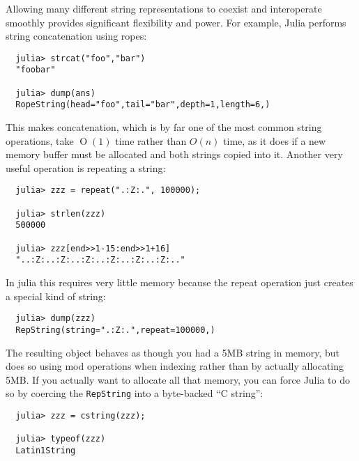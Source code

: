 \documentclass{article}
\renewcommand{\O}{\ensuremath{\operatorname{O}}}
\begin{document}
Allowing many different string representations to coexist and interoperate smoothly provides significant flexibility and power.
For example, Julia performs string concatenation using ropes:
\begin{verbatim}
  julia> strcat("foo","bar")
  "foobar"

  julia> dump(ans)
  RopeString(head="foo",tail="bar",depth=1,length=6,)
\end{verbatim}
This makes concatenation, which is by far one of the most common string operations, take $\O(1)$ time rather than $O(n)$ time, as it does if a new memory buffer must be allocated and both strings copied into it.
Another very useful operation is repeating a string:
\begin{verbatim}
  julia> zzz = repeat(".:Z:.", 100000);

  julia> strlen(zzz)
  500000

  julia> zzz[end>>1-15:end>>1+16]
  "..:Z:..:Z:..:Z:..:Z:..:Z:..:Z:.."
\end{verbatim}
In julia this requires very little memory because the repeat operation just creates a special kind of string:
\begin{verbatim}
  julia> dump(zzz)
  RepString(string=".:Z:.",repeat=100000,)
\end{verbatim}
The resulting object behaves as though you had a 5MB string in memory, but does so using mod operations when indexing rather than by actually allocating 5MB.
If you actually want to allocate all that memory, you can force Julia to do so by coercing the \verb|RepString| into a byte-backed ``C string'':
\begin{verbatim}
  julia> zzz = cstring(zzz);

  julia> typeof(zzz)
  Latin1String
\end{verbatim}

\end{document}
